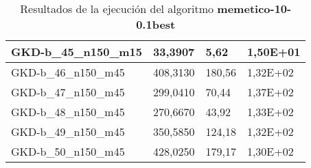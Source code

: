 \begin{table}[!ht]
\begin{adjustbox}{height=12cm}
\begin{tabular}{|l|l|l|l|}
		GKD-b\_45\_n150\_m15 & 33,3907  & 5,62           & 1,50E+01 \\ \hline
		GKD-b\_46\_n150\_m45 & 408,3130 & 180,56         & 1,32E+02 \\ \hline
		GKD-b\_47\_n150\_m45 & 299,0410 & 70,44          & 1,37E+02 \\ \hline
		GKD-b\_48\_n150\_m45 & 270,6670 & 43,92          & 1,33E+02 \\ \hline
		GKD-b\_49\_n150\_m45 & 350,5850 & 124,18         & 1,32E+02 \\ \hline
		GKD-b\_50\_n150\_m45 & 428,0250 & 179,17         & 1,30E+02 \\ \hline
    \end{tabular}
    \end{adjustbox}
    \caption{Resultados de la ejecución del algoritmo \textbf{memetico-10-0.1best}}
\end{table}

\pagebreak